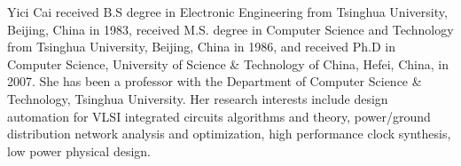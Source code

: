 \documentclass[journal]{IEEEtran}
\begin{document}
\vspace{-0.90cm}
\begin{IEEEbiography}{Yici Cai} received B.S degree in Electronic Engineering from Tsinghua University, Beijing, China in 1983, received M.S. degree in Computer Science and Technology from Tsinghua University, Beijing, China in 1986, and received Ph.D in Computer Science, University of Science \& Technology of China, Hefei, China, in 2007. She has been a professor with the Department of Computer Science \& Technology, Tsinghua University. Her research interests include design automation for VLSI integrated circuits algorithms and theory, power/ground distribution network analysis and optimization, high performance clock synthesis, low power physical design.
\end{IEEEbiography}
\end{document}
